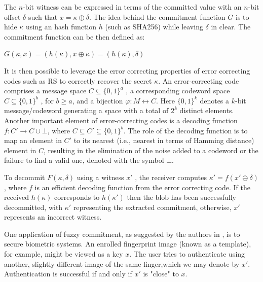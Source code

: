 The $n$-bit witness can be expressed  in terms of the committed value with an $n$-bit offset $\delta$ such that $x = \kappa \oplus \delta$. The idea behind the commitment function $G$ is to hide $\kappa$ using an hash function $h$ (such as SHA256) while leaving $\delta$ in clear. 
The commitment function can be then defined as:
\begin{center}
    $G(\kappa,x) = (h(\kappa), x \oplus \kappa) = (h(\kappa), \delta)$
\end{center}
It is then possible to leverage the error correcting properties of error correcting codes such as \ac{RS} to correctly recover the secret $\kappa$.
An error-correcting code comprises a message space $C \subseteq \{0,1\}^a$ , a corresponding codeword space $C \subseteq \{0,1\}^b$ , for $b \geq a$, and a bijection $\varphi : M \longleftrightarrow C$. 
Here $\{ 0, 1 \}^k$ denotes a $k$-bit message/codeword generating a space with a total of $2^k$ distinct elements.
Another important element of error-correcting codes is a decoding function $f:C' \xrightarrow{} C \cup \bot$, where $C \subseteq C' \subseteq \{0,1\}^b $.
The role of the decoding function is to map an element in $C'$ to its nearest (i.e., nearest in terms of Hamming distance) element in $C$, resulting in the elimination of the noise added to a codeword or the failure to find a valid one, denoted with the symbol $\bot$.


To decommit $F(\kappa,\delta)$ using a witness $x'$ , the receiver computes $\kappa ' = f(x' \oplus \delta)$ , where $f$ is an efficient decoding function from the error correcting code.
If the received $h(\kappa)$ corresponds to $h(\kappa ')$ then the blob has been successfully decommitted, with $\kappa '$ representing the extracted commitment, otherwise, $x'$ represents an incorrect witness. 

One application of fuzzy commitment, as suggested by the authors in \cite{Juels2004AScheme}, is to secure biometric systems.
An enrolled fingerprint image (known as a template), for example, might be viewed as a key $x$. The user tries to authenticate using another, slightly different image of the same finger,which we may denote by $x'$. Authentication is successful if and only if $x'$ is "close" to $x$.


